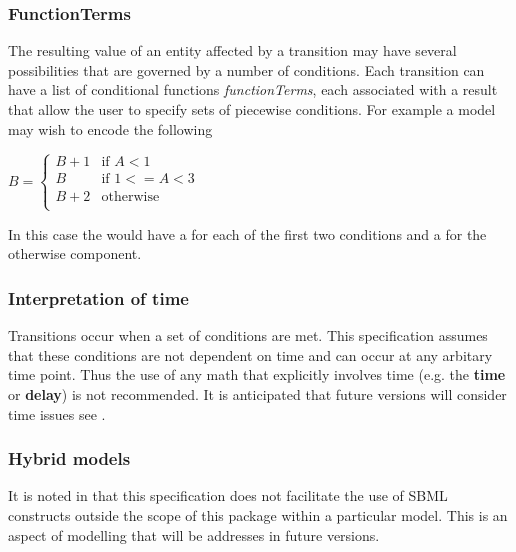 \subsubsection{FunctionTerms}

The resulting value of an entity affected by a transition may have several possibilities that are governed by a number of conditions. Each transition can have a list of conditional functions \emph{functionTerms}, each associated with a result that allow the user to specify sets of piecewise conditions. For example a model may wish to encode the following
\smallskip
\begin{center}
$B = \left\{ \begin{array}{ll}
      B+1 & \mbox{if $A < 1$} \\
      B & \mbox{if $1 <= A < 3$} \\
     B + 2 & \mbox{otherwise}  \\
     \end{array}
\right.
$
\end{center}

\smallskip
In this case the \Transition would have a \FunctionTerm for each of the first two conditions and a \DefaultTerm for the otherwise component.


\subsubsection{Interpretation of time}


Transitions occur when a set of conditions are met.  This specification assumes that these conditions are not dependent on time and can occur at any arbitary time point.  Thus the use of any math that explicitly involves time (e.g. the  \textbf{time} or \textbf{delay}) is not recommended. It is anticipated that future versions will consider time issues see .



\subsubsection{Hybrid models}


It is noted in  that this specification does not facilitate the use of SBML constructs outside the scope of this package within a particular model.  This is an aspect of modelling that will be addresses in future versions.







